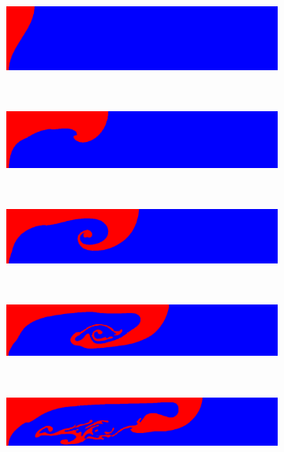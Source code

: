 \documentclass[11pt,a4paper,twoside]{article}
\begin{document}
	\begin{figure}[ht!]
		\begin{center}
			\begin{subfigure}[]{0.1\textwidth}
				\includegraphics[trim=150 0 100 0,clip,angle=-90,origin=c,width=\textwidth]{RT_Cont_1.eps}
				\caption{}
			\end{subfigure}
			~
			\begin{subfigure}[]{0.1\textwidth}
				\includegraphics[trim=150 0 100 0,clip,angle=-90,origin=c,width=\textwidth]{RT_Cont_50.eps}
				\caption{}
			\end{subfigure}
			~
			\begin{subfigure}[]{0.1\textwidth}
				\includegraphics[trim=150 0 100 0,clip,angle=-90,origin=c,width=\textwidth]{RT_Cont_75.eps}
				\caption{}
			\end{subfigure}
			~
			\begin{subfigure}[]{0.1\textwidth}
				\includegraphics[trim=150 0 100 0,clip,angle=-90,origin=c,width=\textwidth]{RT_Cont_110.eps}
				\caption{}
			\end{subfigure}
			~
			\begin{subfigure}[]{0.1\textwidth}
				\includegraphics[trim=150 0 100 0,clip,angle=-90,origin=c,width=\textwidth]{RT_Cont_156.eps}

\end{subfigure}
\end{center}
\end{figure}
\end{document}
